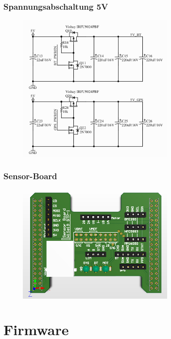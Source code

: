\documentclass{beamer}
\begin{document}
\begin{frame}
\frametitle{Spannungsabschaltung 5V}
\begin{figure}[H]
\centering
\includegraphics[width=0.7\textwidth]{./img/spannungsabschaltung.png}
\end{figure}

\end{frame}


\begin{frame}
\frametitle{Sensor-Board}
\begin{figure}[H]
\centering
\includegraphics[width=0.7\textwidth]{./img/PCB_Sensors_3D_top.PNG}
\end{figure}
\end{frame}

\section{Firmware}
\end{document}
